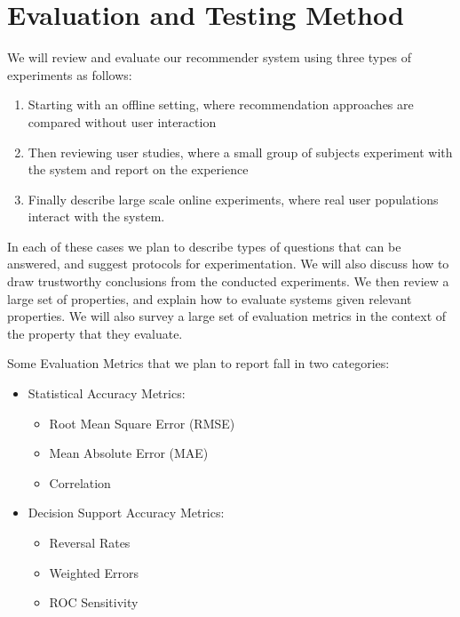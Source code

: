 \documentclass[12pt]{article} %
\begin{document}
\section{Evaluation and Testing Method}

We will review and evaluate our recommender system using three types of experiments as follows:

\begin{enumerate}
\item Starting with an offline setting, where recommendation approaches are compared without user interaction
\item Then reviewing user studies, where a small group of subjects experiment with the system and report on the experience
\item Finally describe large scale online experiments, where real user populations interact with the system. 
\end{enumerate}

In each of these cases we plan to describe types of questions that can be answered, and suggest protocols for experimentation. We will also discuss how to draw trustworthy conclusions from the conducted experiments. We then review a large set of properties, and explain how to evaluate systems given relevant properties. We will also survey a large set of evaluation metrics in the context of the property that they evaluate.

Some Evaluation Metrics that we plan to report fall in two categories:

\begin{itemize}
\item Statistical Accuracy Metrics:
	\begin{itemize}
	\item Root Mean Square Error (RMSE)
	\item Mean Absolute Error (MAE)
	\item Correlation
	\end{itemize}
\item Decision Support Accuracy Metrics:
	\begin{itemize}
	\item Reversal Rates
	\item Weighted Errors
	\item ROC Sensitivity
	\end{itemize}
\end{itemize}
\end{document}
